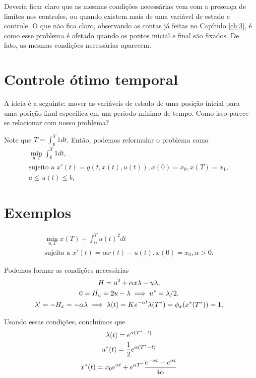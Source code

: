 Deveria ficar claro que as mesmas condições necessárias vem com a presença de
limites nos controles, ou quando existem mais de uma variável de estado e
controle. O que não fica claro, observando as contas já feitas no Capítulo
\ref{ch:3}, é como esse problema é afetado quando os pontos inicial e final
são fixados. De fato, as mesmas condições necessárias aparecem. 

\section{Controle ótimo temporal}

A ideia é a seguinte: mover as variáveis de estado de uma posição inicial para
uma posição final específica em um período mínimo de tempo. Como isso parece
se relacionar com nosso problema? 

Note que $T = \int_0^T 1 dt$. Então, podemos reformular o problema como 
\begin{gather*}
    \min_{u,T} \int_0^T 1 dt, \\ 
    \text{sujeito a   }x'(t) = g(t, x(t), u(t)), x(0) = x_0, x(T) = x_1, \\
    a \le u(t) \le b, 
\end{gather*}

\section{Exemplos}

\begin{example}
    \begin{gather*}
        \min_{u,T} x(T) + \int_0^T u(t)^2 dt \\
        \text{sujeito a   }x'(t) = \alpha x(t) -u(t), x(0) = x_0, \alpha > 0.
    \end{gather*}
\end{example}

Podemos formar as condições necessárias 
\begin{gather*}
    H = u^2 + \alpha x \lambda - u \lambda, \\
    0 = H_u = 2u - \lambda \implies u^* = \lambda/2, \\
    \lambda ' = -H_x = -\alpha \lambda \implies \lambda(t) = Ke^{-\alpha t}
    \lambda(T^*) = \phi_x(x^*(T^*)) = 1, 
\end{gather*}

Usando essas condições, concluímos que 
\begin{gather*}
    \lambda(t) = e^{\alpha(T^* - t)} \\
    u^*(t) = \frac{1}{2}e^{\alpha(T^* - t)} \\
    x^*(t) = x_0e^{\alpha t} + e^{\alpha T^*}\frac{e^{-\alpha t} - e^{\alpha t}}{4\alpha}
\end{gather*}

